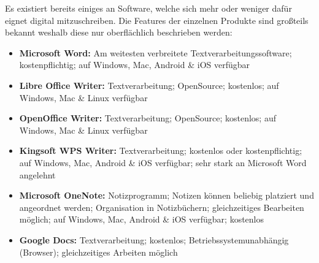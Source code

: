 
Es existiert bereits einiges an Software, welche sich mehr oder weniger dafür eignet digital mitzuschreiben. Die Features der einzelnen Produkte sind großteils bekannt weshalb diese nur oberflächlich beschrieben werden:

\begin{itemize}
\item \textbf{Microsoft Word:} Am weitesten verbreitete Textverarbeitungssoftware; kostenpflichtig; auf Windows, Mac, Android \& iOS verfügbar
\item \textbf{Libre Office Writer:} Textverarbeitung; OpenSource; kostenlos; auf Windows, Mac \& Linux verfügbar
\item \textbf{OpenOffice Writer:} Textverarbeitung; OpenSource; kostenlos; auf Windows, Mac \& Linux verfügbar
\item \textbf{Kingsoft WPS Writer:} Textverarbeitung; kostenlos oder kostenpflichtig; auf Windows, Mac, Android \& iOS verfügbar; sehr stark an Microsoft Word angelehnt
\item \textbf{Microsoft OneNote:} Notizprogramm; Notizen können beliebig platziert und angeordnet werden; Organisation in Notizbüchern; gleichzeitiges Bearbeiten möglich; auf Windows, Mac, Android \& iOS verfügbar; kostenlos
\item \textbf{Google Docs:} Textverarbeitung; kostenlos; Betriebssystemunabhängig (Browser); gleichzeitiges Arbeiten möglich
\end{itemize}